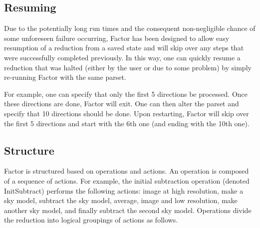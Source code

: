 \documentclass[structabstract]{article}
\begin{document}
\subsection{Resuming}
\label{factor:resuming}

Due to the potentially long run times and the consequent non-negligible chance
of some unforeseen failure occurring, Factor has been designed to allow easy
resumption of a reduction from a saved state and will skip over any steps that
were successfully completed previously. In this way, one can quickly resume a
reduction that was halted (either by the user or due to some problem) by simply
re-running Factor with the same parset.

For example, one can specify that only the first 5 directions be processed.
Once these directions are done, Factor will exit. One can then alter the parset
and specify that 10 directions should be done. Upon restarting, Factor will skip
over the first 5 directions and start with the 6th one (and ending with the 10th
one).


\subsection{Structure}
\label{factor:structure}

Factor is structured based on operations and actions. An operation is composed
of a sequence of actions. For example, the initial subtraction operation
(denoted InitSubtract) performs the following actions: image at high resolution,
make a sky model, subtract the sky model, average, image and low resolution,
make another sky model, and finally subtract the second sky model. Operations
divide the reduction into logical groupings of actions as follows.
\end{document}
